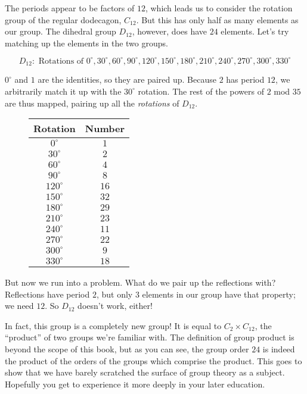 \documentclass[../textbook.tex]{subfiles}
\begin{document}
The periods appear to be factors of $12$, which leads us to consider the rotation group of the regular dodecagon, $C_{12}$. But this has only half as many elements as our group. The dihedral group $D_{12}$, however, does have $24$ elements. Let's try matching up the elements in the two groups.

$$D_{12}:\text{ Rotations of } 0^\circ, 30^\circ, 60^\circ, 90^\circ, 120^\circ, 150^\circ, 180^\circ, 210^\circ, 240^\circ, 270^\circ, 300^\circ, 330^\circ$$

\noindent$0^\circ$ and $1$ are the identities, so they are paired up. Because $2$ has period $12$, we arbitrarily match it up with the $30^\circ$ rotation. The rest of the powers of $2$ mod $35$ are thus mapped, pairing up all the \textit{rotations} of $D_{12}$.

\begin{figure}[h]
	\begin{center}
		\begin{minipage}[b]{\textwidth}
			\centering
			\begin{tabular}{cc}
				\hline
				Rotation & Number \\ \hline
				\rowcolor{light-gray}
				$0^\circ$ & $1$ \\
				$30^\circ$ & $2$ \\
				\rowcolor{light-gray}
				$60^\circ$ & $4$ \\
				$90^\circ$ & $8$ \\
				\rowcolor{light-gray}
				$120^\circ$ & $16$ \\
				$150^\circ$ & $32$ \\
				\rowcolor{light-gray}
				$180^\circ$ & $29$ \\
				$210^\circ$ & $23$ \\
				\rowcolor{light-gray}
				$240^\circ$ & $11$ \\
				$270^\circ$ & $22$ \\
				\rowcolor{light-gray}
				$300^\circ$ & $9$ \\
				$330^\circ$ & $18$ \\ \hline
			\end{tabular}
			\vspace*{0.5\baselineskip}
		\end{minipage}
	\end{center}
	\vspace*{-1\baselineskip}
\end{figure}

\noindent But now we run into a problem. What do we pair up the reflections with? Reflections have period $2$, but only $3$ elements in our group have that property; we need $12$. So $D_{12}$ doesn't work, either!

In fact, this group is a completely new group! It is equal to $C_2\times C_{12}$, the ``product'' of two groups we're familiar with. The definition of group product is beyond the scope of this book, but as you can see, the group order $24$ is indeed the product of the orders of the groups which comprise the product. This goes to show that we have barely scratched the surface of group theory as a subject. Hopefully you get to experience it more deeply in your later education.
\end{document}

